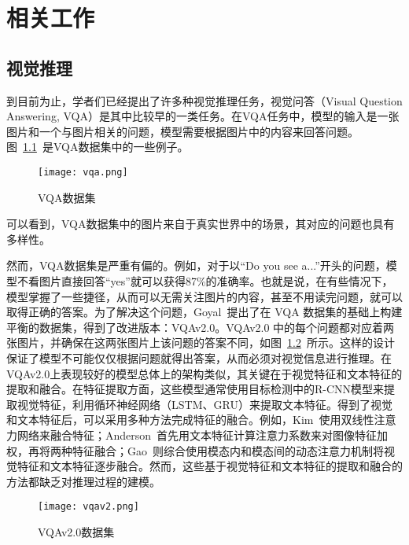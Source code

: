 
\chapter{相关工作}\label{cha:related_work}
\section{视觉推理}\label{sec:visural_reasoning}
到目前为止，学者们已经提出了许多种视觉推理任务，视觉问答（Visual Question Answering, VQA）\cite{antol2015vqa}是其中比较早的一类任务。在VQA任务中，模型的输入是一张图片和一个与图片相关的问题，模型需要根据图片中的内容来回答问题。图~\ref{fig:vqa}~是VQA数据集\cite{antol2015vqa}中的一些例子。
\begin{figure}[!b]
    \texttt{[image: vqa.png]}
    \caption{VQA数据集}
    \label{fig:vqa}
\end{figure}
可以看到，VQA数据集中的图片来自于真实世界中的场景，其对应的问题也具有多样性。

然而，VQA\cite{antol2015vqa}数据集是严重有偏的。例如，对于以``Do you see
a...''开头的问题，模型不看图片直接回答``yes''就可以获得87\%的准确率\cite{goyal2017making}。也就是说，在有些情况下，模型掌握了一些捷径，从而可以无需关注图片的内容，甚至不用读完问题，就可以取得正确的答案。为了解决这个问题，Goyal~\etal\cite{goyal2017making}提出了在 VQA 数据集的基础上构建平衡的数据集，得到了改进版本：VQAv2.0。VQAv2.0 中的每个问题都对应着两张图片，并确保在这两张图片上该问题的答案不同，如图~\ref{fig:vqav2}~所示。这样的设计保证了模型不可能仅仅根据问题就得出答案，从而必须对视觉信息进行推理。在VQAv2.0上表现较好的模型总体上的架构类似\cite{kim2018bilinear,anderson2018bottom,gao2019dynamic}，其关键在于视觉特征和文本特征的提取和融合。在特征提取方面，这些模型通常使用目标检测中的R-CNN\cite{ren2015faster}模型来提取视觉特征，利用循环神经网络（LSTM\cite{hochreiter1997long}、GRU\cite{cho2014learning}）来提取文本特征。得到了视觉和文本特征后，可以采用多种方法完成特征的融合。例如，Kim~\etal\cite{kim2018bilinear}使用双线性注意力网络来融合特征；Anderson~\etal\cite{anderson2018bottom}首先用文本特征计算注意力系数来对图像特征加权，再将两种特征融合；Gao~\etal\cite{gao2019dynamic}则综合使用模态内和模态间的动态注意力机制将视觉特征和文本特征逐步融合。然而，这些基于视觉特征和文本特征的提取和融合的方法都缺乏对推理过程的建模。

\begin{figure}
    \texttt{[image: vqav2.png]}
    \caption{VQAv2.0数据集\cite{goyal2017making}}
    \label{fig:vqav2}
\end{figure}

